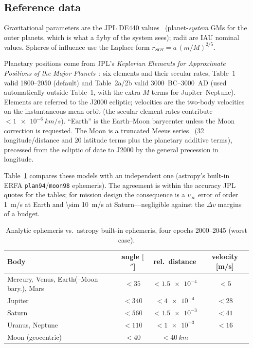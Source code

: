 \documentclass[11pt,a4paper]{article}
\newcommand{\dv}{\Delta v}
\newcommand{\vinf}{v_\infty}
\newcommand{\code}[1]{\texttt{#1}}
\begin{document}
\subsection{Reference data}
Gravitational parameters are the JPL DE440 values~\cite{de440,astropar} (planet-\emph{system}
GMs for the outer planets, which is what a flyby of the system sees); radii are IAU nominal
values. Spheres of influence use the Laplace form $r_{SOI}=a\,(m/M)^{2/5}$.

Planetary positions come from JPL's \emph{Keplerian Elements for Approximate Positions of the
Major Planets}~\cite{standish}: six elements and their secular rates, Table~1 valid
1800--2050 (default) and Table~2a/2b valid 3000~BC--3000~AD (used automatically outside Table~1,
with the extra $M$ terms for Jupiter--Neptune). Elements are referred to the J2000 ecliptic;
velocities are the two-body velocities on the instantaneous mean orbit (the secular element
rates contribute $<\SI{1e-6}{km/s}$). ``Earth'' is the Earth--Moon barycenter unless the
Moon correction is requested. The Moon is a truncated Meeus series~\cite{meeus} (32
longitude/distance and 20 latitude terms plus the planetary additive terms), precessed from
the ecliptic of date to J2000 by the general precession in longitude.

Table~\ref{tab:eph} compares these models with an independent one (astropy's built-in
ERFA \code{plan94}/\code{moon98} ephemeris). The agreement is within the accuracy JPL quotes for
the tables; for mission design the consequence is a $\vinf$ error of order \SI{1}{m/s} at
Earth and \SI{\sim 10}{m/s} at Saturn---negligible against the $\dv$ margins of a budget.

\begin{table}[h]\centering\small
\caption{Analytic ephemeris vs.\ astropy built-in ephemeris, four epochs 2000--2045 (worst case).}
\label{tab:eph}
\begin{tabular}{lccc}\toprule
Body & angle [$''$] & rel.\ distance & velocity [m/s] \\\midrule
Mercury, Venus, Earth(--Moon bary.), Mars & $<35$ & $<\num{1.5e-4}$ & $<5$ \\
Jupiter & $<340$ & $<\num{4e-4}$ & $<28$ \\
Saturn & $<560$ & $<\num{1.5e-3}$ & $<41$ \\
Uranus, Neptune & $<110$ & $<\num{1e-3}$ & $<16$ \\
Moon (geocentric) & $<40$ & $<\SI{40}{km}$ & -- \\\bottomrule
\end{tabular}
\end{table}
\end{document}
